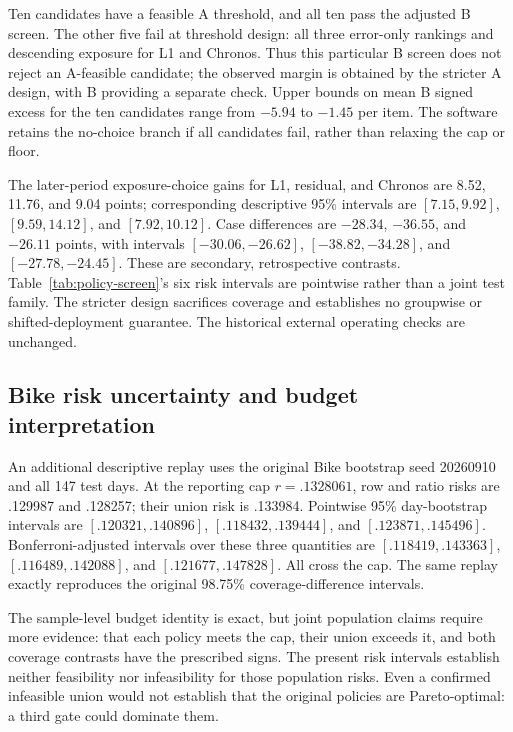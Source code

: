 Ten candidates have a feasible A threshold, and all ten pass the adjusted B screen. The other five fail at threshold design: all three error-only rankings and descending exposure for L1 and Chronos. Thus this particular B screen does not reject an A-feasible candidate; the observed margin is obtained by the stricter A design, with B providing a separate check. Upper bounds on mean B signed excess for the ten candidates range from $-5.94$ to $-1.45$ per item. The software retains the no-choice branch if all candidates fail, rather than relaxing the cap or floor.



The later-period exposure-choice gains for L1, residual, and Chronos are 8.52, 11.76, and 9.04 points; corresponding descriptive 95\% intervals are $[7.15,9.92]$, $[9.59,14.12]$, and $[7.92,10.12]$. Case differences are $-28.34$, $-36.55$, and $-26.11$ points, with intervals $[-30.06,-26.62]$, $[-38.82,-34.28]$, and $[-27.78,-24.45]$. These are secondary, retrospective contrasts. Table~\ref{tab:policy-screen}'s six risk intervals are pointwise rather than a joint test family. The stricter design sacrifices coverage and establishes no groupwise or shifted-deployment guarantee. The historical external operating checks are unchanged.

\subsection{Bike risk uncertainty and budget interpretation}
An additional descriptive replay uses the original Bike bootstrap seed 20260910 and all 147 test days. At the reporting cap $r=.1328061$, row and ratio risks are .129987 and .128257; their union risk is .133984. Pointwise 95\% day-bootstrap intervals are $[.120321,.140896]$, $[.118432,.139444]$, and $[.123871,.145496]$. Bonferroni-adjusted intervals over these three quantities are $[.118419,.143363]$, $[.116489,.142088]$, and $[.121677,.147828]$. All cross the cap. The same replay exactly reproduces the original 98.75\% coverage-difference intervals.

The sample-level budget identity is exact, but joint population claims require more evidence: that each policy meets the cap, their union exceeds it, and both coverage contrasts have the prescribed signs. The present risk intervals establish neither feasibility nor infeasibility for those population risks. Even a confirmed infeasible union would not establish that the original policies are Pareto-optimal: a third gate could dominate them.

